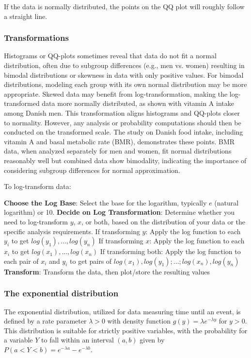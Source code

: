 \documentclass{article}
\begin{document}
If the data is normally distributed, the points on the QQ plot will roughly follow a straight line.

\subsubsection{Transformations}

Histograms or QQ-plots sometimes reveal that data do not fit a normal distribution, often due to subgroup differences (e.g., men vs. women) resulting in bimodal distributions or skewness in data with only positive values. For bimodal distributions, modeling each group with its own normal distribution may be more appropriate. Skewed data may benefit from log-transformation, making the log-transformed data more normally distributed, as shown with vitamin A intake among Danish men. This transformation aligns histograms and QQ-plots closer to normality. However, any analysis or probability computations should then be conducted on the transformed scale. The study on Danish food intake, including vitamin A and basal metabolic rate (BMR), demonstrates these points. BMR data, when analyzed separately for men and women, fit normal distributions reasonably well but combined data show bimodality, indicating the importance of considering subgroup differences for normal approximation.

To log-transform data:

\begin{outline}
    \1 \textbf{Choose the Log Base}: Select the base for the logarithm, typically $e$ (natural logarithm) or 10.
    \1 \textbf{Decide on Log Transformation}: Determine whether you need to log-transform $y$, $x$, or both, based on the distribution of your data or the specific analysis requirements.
        \2 If transforming $y$: Apply the log function to each $y_i$ to get $log(y_1), ..., log(y_n)$
        \2 If transforming $x$: Apply the log function to each $x_i$ to get $log(x_1), ..., log(x_n)$
        \2 If transforming both: Apply the log function to each pair of $x_i$ and $y_i$ to get pairs of $log(x_1),log(y_1);...;log(x_n),log(y_n)$
    \1 \textbf{Transform}: Transform the data, then plot/store the resulting values
\end{outline}

\subsubsection{The exponential distribution}
The exponential distribution, utilized for data measuring time until an event, is defined by a rate parameter \(\lambda > 0\) with density function \(g(y) = \lambda e^{-\lambda y}\) for \(y > 0\). This distribution is suitable for strictly positive variables, with the probability for a variable \(Y\) to fall within an interval \((a, b)\) given by \(P(a < Y < b) = e^{-\lambda a} - e^{-\lambda b}\).
\end{document}
